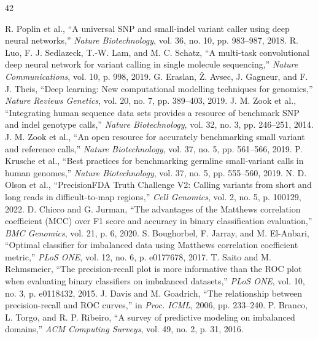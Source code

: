 \documentclass[10pt,a4paper]{article}
\begin{document}
\begin{thebibliography}{42}
\footnotesize
\setlength{\itemsep}{1.5pt}

 R. Poplin et al., ``A universal SNP and small-indel variant caller using deep neural networks,'' \textit{Nature Biotechnology}, vol. 36, no. 10, pp. 983--987, 2018.
 R. Luo, F. J. Sedlazeck, T.-W. Lam, and M. C. Schatz, ``A multi-task convolutional deep neural network for variant calling in single molecule sequencing,'' \textit{Nature Communications}, vol. 10, p. 998, 2019.
 G. Eraslan, \v{Z}. Avsec, J. Gagneur, and F. J. Theis, ``Deep learning: New computational modelling techniques for genomics,'' \textit{Nature Reviews Genetics}, vol. 20, no. 7, pp. 389--403, 2019.
 J. M. Zook et al., ``Integrating human sequence data sets provides a resource of benchmark SNP and indel genotype calls,'' \textit{Nature Biotechnology}, vol. 32, no. 3, pp. 246--251, 2014.
 J. M. Zook et al., ``An open resource for accurately benchmarking small variant and reference calls,'' \textit{Nature Biotechnology}, vol. 37, no. 5, pp. 561--566, 2019.
 P. Krusche et al., ``Best practices for benchmarking germline small-variant calls in human genomes,'' \textit{Nature Biotechnology}, vol. 37, no. 5, pp. 555--560, 2019.
 N. D. Olson et al., ``PrecisionFDA Truth Challenge V2: Calling variants from short and long reads in difficult-to-map regions,'' \textit{Cell Genomics}, vol. 2, no. 5, p. 100129, 2022.
 D. Chicco and G. Jurman, ``The advantages of the Matthews correlation coefficient (MCC) over F1 score and accuracy in binary classification evaluation,'' \textit{BMC Genomics}, vol. 21, p. 6, 2020.
 S. Boughorbel, F. Jarray, and M. El-Anbari, ``Optimal classifier for imbalanced data using Matthews correlation coefficient metric,'' \textit{PLoS ONE}, vol. 12, no. 6, p. e0177678, 2017.
 T. Saito and M. Rehmsmeier, ``The precision-recall plot is more informative than the ROC plot when evaluating binary classifiers on imbalanced datasets,'' \textit{PLoS ONE}, vol. 10, no. 3, p. e0118432, 2015.
 J. Davis and M. Goadrich, ``The relationship between precision-recall and ROC curves,'' in \textit{Proc. ICML}, 2006, pp. 233--240.
 P. Branco, L. Torgo, and R. P. Ribeiro, ``A survey of predictive modeling on imbalanced domains,'' \textit{ACM Computing Surveys}, vol. 49, no. 2, p. 31, 2016.

\end{thebibliography}
\end{document}
